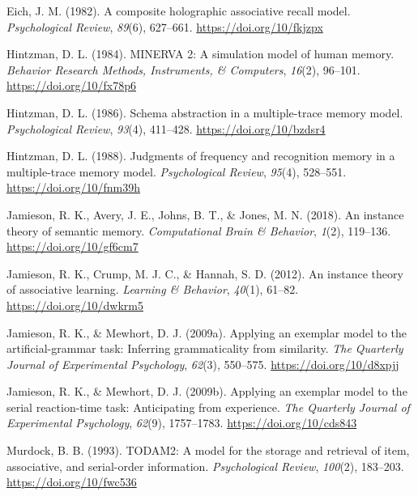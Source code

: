 \documentclass[
  english,
  man,floatsintext]{apa6}
\begin{document}
\leavevmode\hypertarget{ref-eichCompositeHolographicAssociative1982}{}%
Eich, J. M. (1982). A composite holographic associative recall model. \emph{Psychological Review}, \emph{89}(6), 627--661. \url{https://doi.org/10/fkjzpx}

\leavevmode\hypertarget{ref-hintzmanMINERVASimulationModel1984}{}%
Hintzman, D. L. (1984). MINERVA 2: A simulation model of human memory. \emph{Behavior Research Methods, Instruments, \& Computers}, \emph{16}(2), 96--101. \url{https://doi.org/10/fx78p6}

\leavevmode\hypertarget{ref-hintzmanSchemaAbstractionMultipletrace1986}{}%
Hintzman, D. L. (1986). Schema abstraction in a multiple-trace memory model. \emph{Psychological Review}, \emph{93}(4), 411--428. \url{https://doi.org/10/bzdsr4}

\leavevmode\hypertarget{ref-hintzmanJudgmentsFrequencyRecognition1988}{}%
Hintzman, D. L. (1988). Judgments of frequency and recognition memory in a multiple-trace memory model. \emph{Psychological Review}, \emph{95}(4), 528--551. \url{https://doi.org/10/fnm39h}

\leavevmode\hypertarget{ref-jamiesonInstanceTheorySemantic2018}{}%
Jamieson, R. K., Avery, J. E., Johns, B. T., \& Jones, M. N. (2018). An instance theory of semantic memory. \emph{Computational Brain \& Behavior}, \emph{1}(2), 119--136. \url{https://doi.org/10/gf6cm7}

\leavevmode\hypertarget{ref-jamiesonInstanceTheoryAssociative2012}{}%
Jamieson, R. K., Crump, M. J. C., \& Hannah, S. D. (2012). An instance theory of associative learning. \emph{Learning \& Behavior}, \emph{40}(1), 61--82. \url{https://doi.org/10/dwkrm5}

\leavevmode\hypertarget{ref-jamiesonApplyingExemplarModel2009}{}%
Jamieson, R. K., \& Mewhort, D. J. (2009a). Applying an exemplar model to the artificial-grammar task: Inferring grammaticality from similarity. \emph{The Quarterly Journal of Experimental Psychology}, \emph{62}(3), 550--575. \url{https://doi.org/10/d8xpjj}

\leavevmode\hypertarget{ref-jamiesonApplyingExemplarModel2009a}{}%
Jamieson, R. K., \& Mewhort, D. J. (2009b). Applying an exemplar model to the serial reaction-time task: Anticipating from experience. \emph{The Quarterly Journal of Experimental Psychology}, \emph{62}(9), 1757--1783. \url{https://doi.org/10/cds843}

\leavevmode\hypertarget{ref-murdockTODAM2ModelStorage1993}{}%
Murdock, B. B. (1993). TODAM2: A model for the storage and retrieval of item, associative, and serial-order information. \emph{Psychological Review}, \emph{100}(2), 183--203. \url{https://doi.org/10/fwc536}

\endgroup
\end{document}
